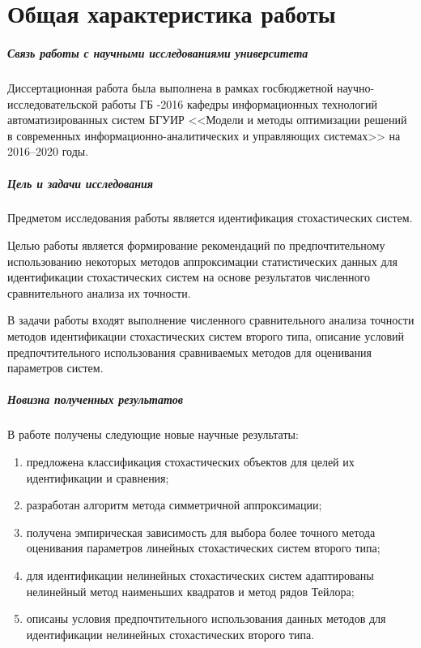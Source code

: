 \chapter*{Общая характеристика работы}

\paragraph{Связь работы с научными исследованиями университета}
Диссертационная работа была выполнена в рамках госбюджетной
научно-исследовательской работы ГБ -2016 кафедры
информационных технологий автоматизированных систем БГУИР
<<Модели и методы оптимизации решений в современных
информационно-аналитических и управляющих системах>>
на 2016--2020 годы.

\paragraph{Цель и задачи исследования}
Предметом исследования работы является идентификация стохастических систем.

Целью работы является формирование рекомендаций по предпочтительному использованию
некоторых методов аппроксимации статистических данных для идентификации
стохастических систем на основе результатов численного сравнительного
анализа их точности.

В задачи работы входят выполнение численного сравнительного анализа
точности методов идентификации стохастических систем второго типа,
описание условий предпочтительного использования сравниваемых методов
для оценивания параметров систем.

\paragraph{Новизна полученных результатов}

В работе получены следующие новые научные результаты:
\begin{enumerate}
\item предложена классификация стохастических объектов для целей их
  идентификации и сравнения;
\item разработан алгоритм метода симметричной аппроксимации;
\item получена эмпирическая зависимость для выбора более точного метода
  оценивания параметров линейных стохастических систем второго типа;
\item для идентификации нелинейных стохастических систем
  адаптированы нелинейный метод наименьших квадратов и метод рядов Тейлора;
\item описаны условия предпочтительного использования данных
  методов для идентификации нелинейных стохастических второго типа.
\end{enumerate}

